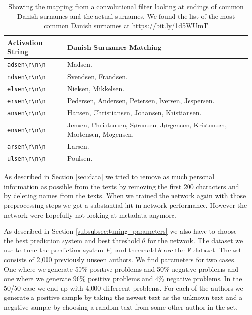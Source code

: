 \begin{table}
    \begin{tabular}{ll}
        \textbf{Activation String} & \textbf{Danish Surnames Matching} \\
        \hline
        \verb!adsen\n\n\n! & Madsen. \\
        \verb!ndsen\n\n\n! & Svendsen, Frandsen. \\
        \verb!elsen\n\n\n! & Nielsen, Mikkelsen. \\
        \verb!ersen\n\n\n! & Pedersen, Andersen, Petersen, Iversen, Jespersen. \\
        \verb!ansen\n\n\n! & Hansen, Christiansen, Johansen, Kristiansen. \\
        \verb!ensen\n\n\n! & Jensen, Christensen, S\o rensen, J\o rgensen,
                             Kristensen, Mortensen, Mogensen. \\
        \verb!arsen\n\n\n! & Larsen. \\
        \verb!ulsen\n\n\n! & Poulsen.
    \end{tabular}
    \caption{Showing the mapping from a convolutional filter looking at endings
        of common Danish surnames and the actual surnames. We found the list of
        the most common Danish surnames at \url{https://bit.ly/1d5WUmT}}
    \label{tab:name_features}
\end{table}

As described in Section \ref{sec:data} we tried to remove as much personal
information as possible from the texts by removing the first 200 characters and
by deleting names from the texts. When we trained the network again with those
preprocessing steps we got a substantial hit in network performance. However the
network were hopefully not looking at metadata anymore.

As described in Section \ref{subsubsec:tuning_parameters} we also have to choose
the best prediction system and best threshold $\theta$ for the network. The
dataset we use to tune the prediction system $P_x$ and threshold $\theta$ are
the \gls{F} dataset. The set consists of 2,000 previously unseen authors. We
find parameters for two cases. One where we generate 50\% positive problems and
50\% negative problems and one where we generate 96\% positive problems and 4\%
negative problems. In the 50/50 case we end up with 4,000 differeent problems.
For each of the authors we generate a positive sample by taking the newest text
as the unknown text and a negative sample by choosing a random text from some
other author in the set.

